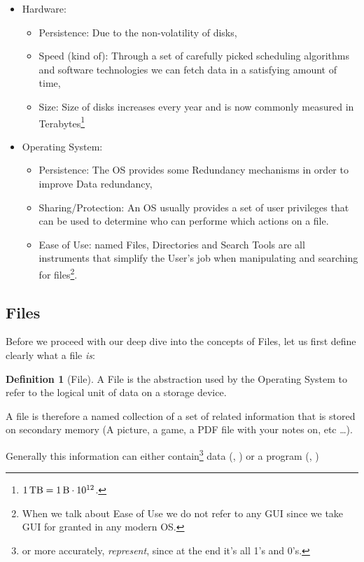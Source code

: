 \documentclass[openright, twoside]{report}
\theoremstyle{definition}
\newtheorem{definition}{Definition}[section]
\theoremstyle{example}
\begin{document}
\begin{itemize}
	\item Hardware:
	\begin{itemize}
		\item Persistence: Due to the non-volatility of disks,
		\item Speed (kind of): Through a set of carefully picked scheduling algorithms and software 
		technologies we can fetch data in a satisfying amount of time, 
		\item Size: Size of disks increases every year and is now commonly measured in Terabytes\footnote{
			$\SI{1}{\tera\byte} = \SI{1}{\byte}\cdot10^{12}$.
		}
	\end{itemize}
	\item Operating System:
	\begin{itemize}
		\item Persistence: The OS provides some Redundancy mechanisms in order to improve Data redundancy,
		\item Sharing/Protection: An OS usually provides a set of user privileges that can be used to determine who 
		can performe which actions on a file.
		\item Ease of Use: named Files, Directories and Search Tools are all instruments that simplify the 
		User's job when manipulating and searching for files\footnote{When we talk about Ease of Use we do not 
		refer to any GUI since we take GUI for granted in any modern OS.}.
	\end{itemize}
\end{itemize}

\subsection{Files}
Before we proceed with our deep dive into the concepts of Files, let us first 
define clearly what a file \emph{is}:

\begin{definition}[File]
	A File is the abstraction used by the Operating System to refer to the logical 
	unit of data on a storage device.
\end{definition}

A file is therefore a named collection of a set of related information that is stored 
on secondary memory (A picture, a game, a PDF file with your notes on, etc \dots).

Generally this information can either contain\footnote{or more accurately, \emph{represent}, 
since at the end it's all 1's and 0's.} data (, ) or a program (, )
\end{document}
